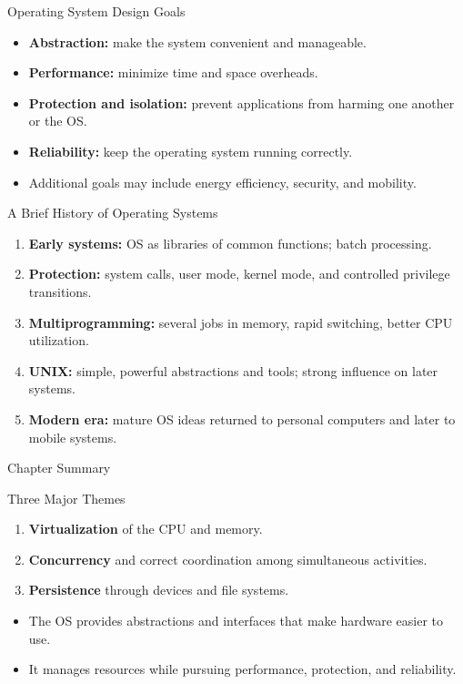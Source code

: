\begin{frame}{Operating System Design Goals}
  \begin{itemize}
    \item \textbf{Abstraction:} make the system convenient and manageable.
    \item \textbf{Performance:} minimize time and space overheads.
    \item \textbf{Protection and isolation:} prevent applications from harming one another or the OS.
    \item \textbf{Reliability:} keep the operating system running correctly.
    \item Additional goals may include energy efficiency, security, and mobility.
  \end{itemize}
\end{frame}

\begin{frame}{A Brief History of Operating Systems}
  \begin{enumerate}
    \item \textbf{Early systems:} OS as libraries of common functions; batch processing.
    \item \textbf{Protection:} system calls, user mode, kernel mode, and controlled privilege transitions.
    \item \textbf{Multiprogramming:} several jobs in memory, rapid switching, better CPU utilization.
    \item \textbf{UNIX:} simple, powerful abstractions and tools; strong influence on later systems.
    \item \textbf{Modern era:} mature OS ideas returned to personal computers and later to mobile systems.
  \end{enumerate}

\end{frame}

\begin{frame}{Chapter Summary}
  \begin{block}{Three Major Themes}
    \begin{enumerate}
      \item \textbf{Virtualization} of the CPU and memory.
      \item \textbf{Concurrency} and correct coordination among simultaneous activities.
      \item \textbf{Persistence} through devices and file systems.
    \end{enumerate}
  \end{block}

  \vspace{0.5em}
  \begin{itemize}
    \item The OS provides abstractions and interfaces that make hardware easier to use.
    \item It manages resources while pursuing performance, protection, and reliability.
  \end{itemize}
\end{frame}


